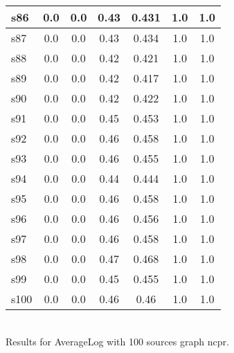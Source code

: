 \documentclass{article}
\begin{document}
\begin{tabular}{|l|c|c|c|c|c|c|}
\hline
s86 &0.0 & 0.0 & 0.43 & 0.431 & 1.0 & 1.0\\
\hline
s87 &0.0 & 0.0 & 0.43 & 0.434 & 1.0 & 1.0\\
\hline
s88 &0.0 & 0.0 & 0.42 & 0.421 & 1.0 & 1.0\\
\hline
s89 &0.0 & 0.0 & 0.42 & 0.417 & 1.0 & 1.0\\
\hline
s90 &0.0 & 0.0 & 0.42 & 0.422 & 1.0 & 1.0\\
\hline
s91 &0.0 & 0.0 & 0.45 & 0.453 & 1.0 & 1.0\\
\hline
s92 &0.0 & 0.0 & 0.46 & 0.458 & 1.0 & 1.0\\
\hline
s93 &0.0 & 0.0 & 0.46 & 0.455 & 1.0 & 1.0\\
\hline
s94 &0.0 & 0.0 & 0.44 & 0.444 & 1.0 & 1.0\\
\hline
s95 &0.0 & 0.0 & 0.46 & 0.458 & 1.0 & 1.0\\
\hline
s96 &0.0 & 0.0 & 0.46 & 0.456 & 1.0 & 1.0\\
\hline
s97 &0.0 & 0.0 & 0.46 & 0.458 & 1.0 & 1.0\\
\hline
s98 &0.0 & 0.0 & 0.47 & 0.468 & 1.0 & 1.0\\
\hline
s99 &0.0 & 0.0 & 0.45 & 0.455 & 1.0 & 1.0\\
\hline
s100 &0.0 & 0.0 & 0.46 & 0.46 & 1.0 & 1.0\\
\hline
\end{tabular}\\

\noindent Results for AverageLog with 100 sources graph ncpr.
\end{document}
